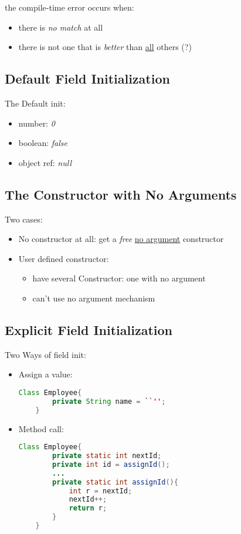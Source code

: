 \documentclass[12pt]{article}
\begin{document}
the compile-time error occurs when:
\begin{itemize}
    \item there is \textit{no match} at all
    \item there is not one that is \textit{better} than \underline{all} others (?)
\end{itemize}

\subsection{Default Field Initialization}
The Default init:
\begin{itemize}
    \item number: \emph{0}
    \item boolean: \emph{false}
    \item object ref: \emph{null}
\end{itemize}

\subsection{The Constructor with No Arguments}
Two cases:
\begin{itemize}
    \item No constructor at all: get a \emph{free} \underline{no argument} constructor
    \item User defined constructor:
    \begin{itemize}
        \item have several Constructor: one with no argument
        \item can't use no argument mechanism
    \end{itemize}
\end{itemize}

\subsection{Explicit Field Initialization}
Two Ways of field init:
\begin{itemize}
    \item Assign a value:
    \begin{lstlisting}[language=Java]
    Class Employee{
        private String name = ``'';
    }   
    \end{lstlisting}
    \item Method call:
    \begin{lstlisting}[language=Java]
    Class Employee{
        private static int nextId;
        private int id = assignId();
        ... 
        private static int assignId(){
            int r = nextId;
            nextId++;
            return r;
        }
    }
    \end{lstlisting}
\end{itemize}
\end{document}
